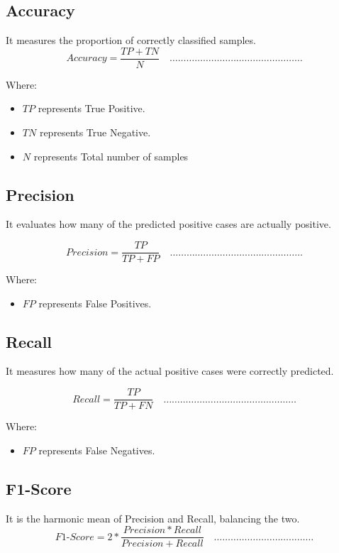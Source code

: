 \renewcommand{\theequation}{Eq (\arabic{equation})}
\subsection{Accuracy}
It measures the proportion of correctly classified samples.
\begin{equation}
\label{eq:Accuracy}
Accuracy= \frac{TP + TN}{N} \quad \dots \dots \dots \dots \dots \dots \dots \dots \dots \dots \dots \dots \dots \dots \dots \dots
\end{equation}

Where:
\begin{itemize}
    \item $TP$ represents True Positive.
    \item  $TN$ represents True Negative.
    \item $N$ represents Total number of samples
\end{itemize}

\subsection{Precision}
It evaluates how many of the predicted positive cases are actually positive.  

\begin{equation}
\label{eq:Precision}
Precision= \frac{TP}{TP + FP} \quad \dots \dots \dots \dots \dots \dots \dots \dots \dots \dots \dots \dots \dots \dots \dots \dots
\end{equation}

Where:
\begin{itemize}
    \item  $FP$ represents False Positives.
\end{itemize}
  
\subsection{Recall}
It measures how many of the actual positive cases were correctly predicted.   

\begin{equation}
\label{eq:Recall}
Recall= \frac{TP}{TP + FN} \quad \dots \dots \dots \dots \dots \dots \dots \dots \dots \dots \dots \dots \dots \dots \dots \dots
\end{equation}

Where:
\begin{itemize}
    \item  $FP$ represents False Negatives.
\end{itemize}

\subsection{F1-Score}
It is the harmonic mean of Precision and Recall, balancing the two.     
\begin{equation}
\label{eq:F1-Score}
F1\text{-}Score= 2*\frac{Precision * Recall }{Precision + Recall} \quad \dots \dots \dots \dots \dots \dots \dots \dots \dots \dots \dots \dots
\end{equation}